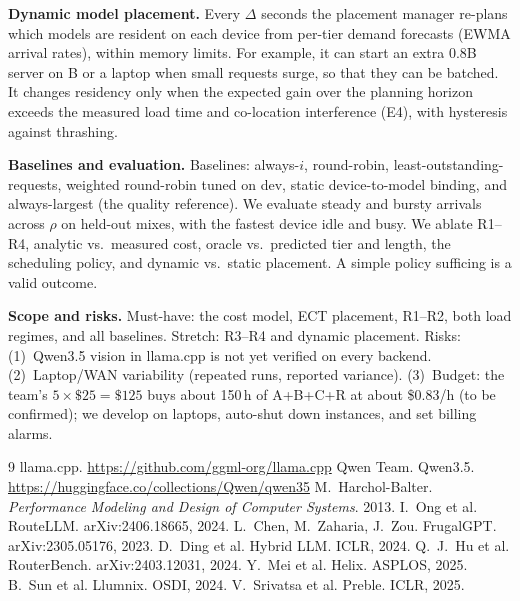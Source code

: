 \documentclass[10pt,twocolumn,letterpaper]{article}
\newcommand{\para}[1]{\textbf{#1}\hspace{0.4em}}
\begin{document}
\para{Dynamic model placement.} Every $\Delta$ seconds the placement manager
re-plans which models are resident on each device from per-tier demand
forecasts (EWMA arrival rates), within memory limits. For example, it can start
an extra 0.8B server on B or a laptop when small requests surge, so that they
can be batched. It changes residency only when the expected gain over the
planning horizon exceeds the measured load time and co-location interference
(E4), with hysteresis against thrashing.

\para{Baselines and evaluation.} Baselines: always-$i$, round-robin,
least-outstanding-requests, weighted round-robin tuned on dev, static
device-to-model binding, and always-largest (the quality reference). We
evaluate steady and bursty arrivals across $\rho$ on held-out mixes, with the
fastest device idle and busy. We ablate R1--R4, analytic vs.\ measured cost,
oracle vs.\ predicted tier and length, the scheduling policy, and dynamic
vs.\ static placement. A simple policy sufficing is a valid outcome.

\para{Scope and risks.} Must-have: the cost model, ECT placement, R1--R2, both
load regimes, and all baselines. Stretch: R3--R4 and dynamic placement. Risks:
(1)~Qwen3.5 vision in llama.cpp is not yet verified on every backend.
(2)~Laptop/WAN variability (repeated runs, reported variance). (3)~Budget: the team's $5\times\$25=\$125$ buys about 150\,h of
A+B+C+R at about \$0.83/h (to be confirmed); we develop on laptops,
auto-shut down instances, and set billing alarms.

{\footnotesize
\begin{thebibliography}{9}\setlength{\itemsep}{0pt}
 llama.cpp. \url{https://github.com/ggml-org/llama.cpp}
 Qwen Team. Qwen3.5. \url{https://huggingface.co/collections/Qwen/qwen35}
 M.~Harchol-Balter. \emph{Performance Modeling and Design of
Computer Systems}. 2013.
 I.~Ong et al. RouteLLM. arXiv:2406.18665, 2024.
 L.~Chen, M.~Zaharia, J.~Zou. FrugalGPT. arXiv:2305.05176, 2023.
 D.~Ding et al. Hybrid LLM. ICLR, 2024.
 Q.~J.~Hu et al. RouterBench. arXiv:2403.12031, 2024.
 Y.~Mei et al. Helix. ASPLOS, 2025.
 B.~Sun et al. Llumnix. OSDI, 2024.
 V.~Srivatsa et al. Preble. ICLR, 2025.
\end{thebibliography}}

\appendix

\end{document}
